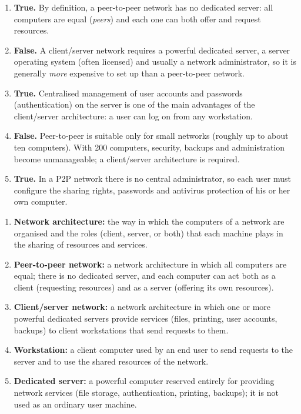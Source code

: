 \documentclass[11pt]{article}
\newcommand{\cle}[1]{{\popxbold\color{popdark}#1}}
\begin{document}
\begin{corrige}
\begin{enumerate}
\item \textbf{True.} By definition, a \cle{peer-to-peer} network has no dedicated server: all computers are equal (\emph{peers}) and each one can both offer and request resources.
\item \textbf{False.} A \cle{client/server} network requires a powerful dedicated server, a server operating system (often licensed) and usually a network administrator, so it is generally \emph{more} expensive to set up than a peer-to-peer network.
\item \textbf{True.} Centralised management of user accounts and passwords (authentication) on the server is one of the main advantages of the \cle{client/server} architecture: a user can log on from any workstation.
\item \textbf{False.} Peer-to-peer is suitable only for small networks (roughly up to about ten computers). With 200 computers, security, backups and administration become unmanageable; a \cle{client/server} architecture is required.
\item \textbf{True.} In a P2P network there is no central administrator, so each user must configure the sharing rights, passwords and antivirus protection of his or her own computer.
\end{enumerate}
\end{corrige}

\begin{corrige}
\begin{enumerate}
\item \textbf{\cle{Network architecture}:} the way in which the computers of a network are organised and the roles (\cle{client}, \cle{server}, or both) that each machine plays in the sharing of resources and services.
\item \textbf{\cle{Peer-to-peer network}:} a network architecture in which all computers are equal; there is no dedicated server, and each computer can act both as a \cle{client} (requesting resources) and as a \cle{server} (offering its own resources).
\item \textbf{\cle{Client/server network}:} a network architecture in which one or more powerful \cle{dedicated servers} provide services (files, printing, user accounts, backups) to \cle{client workstations} that send requests to them.
\item \textbf{\cle{Workstation}:} a client computer used by an end user to send requests to the server and to use the shared resources of the network.
\item \textbf{\cle{Dedicated server}:} a powerful computer reserved entirely for providing network services (file storage, authentication, printing, backups); it is not used as an ordinary user machine.
\end{enumerate}
\end{corrige}
\end{document}
